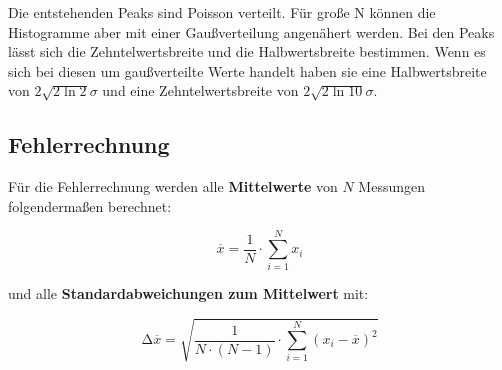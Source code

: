 Die entstehenden Peaks sind Poisson verteilt. Für große N können die
Histogramme aber mit einer Gaußverteilung angenähert werden. Bei den Peaks
lässt sich die Zehntelwertsbreite und die Halbwertsbreite bestimmen. Wenn es
sich bei diesen um gaußverteilte Werte handelt haben sie eine Halbwertsbreite
von $2\sqrt{2\ln 2} \sigma$ und eine Zehntelwertsbreite von $2 \sqrt{2\ln10}\sigma$.



\newpage
\subsection{Fehlerrechnung}
Für die Fehlerrechnung werden alle \textbf{Mittelwerte} von $N$ Messungen
folgendermaßen berechnet:

\begin{equation}
	\overline{x} = \frac{1}{N} \cdot \sum_{i=1}^N x_i
	\label{eqn:Mittelwert}
\end{equation}

und alle \textbf{Standardabweichungen zum Mittelwert} mit:

\begin{equation}
	\increment\overline{x} = \sqrt{\frac{1}{N\cdot(N-1)}\cdot\sum_{i=1}^N (x_i-\overline{x})^2}
	\label{eqn:St_Mittelwert}
\end{equation}


